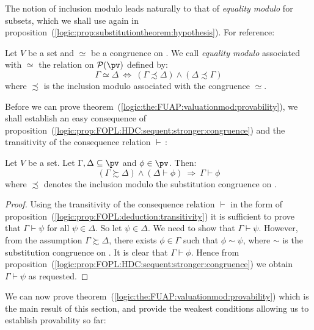 The notion of inclusion modulo leads naturally to that of {\em
equality modulo} for subsets, which we shall use again in
proposition~(\ref{logic:prop:substitutiontheorem:hypothesis}). For
reference:

\begin{defin}\label{logic:def:FUAP:valuationmod:equality:modulo}
Let $V$ be a set and $\simeq$ be a congruence on \pv. We call {\em
equality modulo} associated with $\simeq$ the relation on ${\cal
P}(\pv)$ defined by:
    \[
    \Gamma\simeq\Delta\ \Leftrightarrow\
    (\Gamma\precsim\Delta)\land(\Delta\precsim\Gamma)
    \]
where $\precsim$ is the inclusion modulo associated with the
congruence $\simeq$.
\end{defin}

Before we can prove
theorem~(\ref{logic:the:FUAP:valuationmod:provability}), we shall
establish an easy consequence of
proposition~(\ref{logic:prop:FOPL:HDC:sequent:stronger:congruence})
and the transitivity of the consequence relation $\vdash$\,:

\begin{prop}\label{logic:prop:FUAP:valuationmod:hypothesis:modulo}
Let $V$ be a set. Let $\Gamma, \Delta\subseteq\pv$ and $\phi\in\pv$.
Then:
    \[
    (\Gamma\succsim\Delta)\land(\Delta\vdash\phi)\ \Rightarrow\
    \Gamma\vdash\phi
    \]
where $\precsim$ denotes the inclusion modulo the substitution
congruence on \pv.
\end{prop}
\begin{proof}
Using the transitivity of the consequence relation $\vdash$ in the
form of proposition~(\ref{logic:prop:FOPL:deduction:transitivity})
it is sufficient to prove that $\Gamma\vdash\psi$ for all
$\psi\in\Delta$. So let $\psi\in\Delta$. We need to show that
$\Gamma\vdash\psi$. However, from the assumption
$\Gamma\succsim\Delta$, there exists $\phi\in\Gamma$ such that
$\phi\sim\psi$, where $\sim$ is the substitution congruence on \pv.
It is clear that $\Gamma\vdash\phi$. Hence from
proposition~(\ref{logic:prop:FOPL:HDC:sequent:stronger:congruence})
we obtain $\Gamma\vdash\psi$ as requested.
\end{proof}

We can now prove
theorem~(\ref{logic:the:FUAP:valuationmod:provability}) which is the
main result of this section, and provide the weakest conditions
allowing us to establish provability so far:

